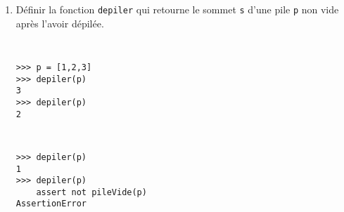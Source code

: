 \begin{question}
\begin{enumerate}
\item Définir la fonction \texttt{depiler} qui retourne le sommet \texttt{s}
	d'une pile \texttt{p} non vide après l'avoir dépilée.

\noindent\begin{minipage}[t]{6cm}\tt\footnotesize
\begin{Verbatim}
>>> p = [1,2,3]
>>> depiler(p)
3
>>> depiler(p)
2
\end{Verbatim}
\end{minipage}
\hfill
\begin{minipage}[t]{6cm}\tt\footnotesize
\begin{Verbatim}
>>> depiler(p)
1
>>> depiler(p)
    assert not pileVide(p)
AssertionError
\end{Verbatim}
\end{minipage}
\vspace*{2mm}

\end{enumerate}

\end{question}

